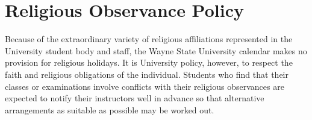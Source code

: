 \section*{Religious Observance Policy}
Because of the extraordinary variety of religious affiliations represented in the University student body and staff, the Wayne State University calendar makes no provision for religious holidays.
It is University policy, however, to respect the faith and religious obligations of the individual.
Students who find that their classes or examinations involve conflicts with their religious observances are expected to notify their instructors well in advance so that alternative arrangements as suitable as possible may be worked out.


